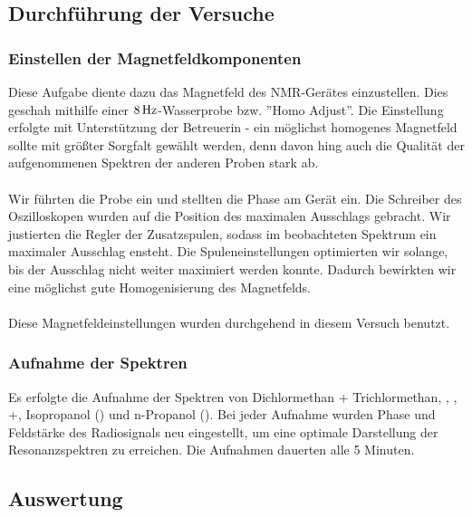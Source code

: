 \documentclass[a4paper,titlepage]{scrartcl}
\numberwithin{equation}{section}
\begin{document}
\subsection{Durchführung der Versuche}
\subsubsection{Einstellen der Magnetfeldkomponenten}
Diese Aufgabe diente dazu das Magnetfeld des NMR-Gerätes einzustellen. Dies geschah mithilfe einer $\unit[8]{Hz}$-Wasserprobe bzw. ''Homo Adjust''. Die Einstellung erfolgte mit Unterstützung der Betreuerin - ein möglichst homogenes Magnetfeld sollte mit größter Sorgfalt gewählt werden, denn davon hing auch die Qualität der aufgenommenen Spektren der anderen Proben stark ab.\\ \\
Wir führten die Probe ein und stellten die Phase am Gerät ein. Die Schreiber des Oszilloskopen wurden auf die Position des maximalen Ausschlags gebracht. Wir justierten die Regler der Zusatzspulen, sodass im beobachteten Spektrum ein maximaler Ausschlag ensteht. Die Spuleneinstellungen optimierten wir solange, bis der Ausschlag nicht weiter maximiert werden konnte. Dadurch bewirkten wir eine möglichst gute Homogenisierung des Magnetfelds.\\ \\
Diese Magnetfeldeinstellungen wurden durchgehend in diesem Versuch benutzt.
\subsubsection{Aufnahme der Spektren}
Es erfolgte die Aufnahme der Spektren von Dichlormethan + Trichlormethan, , , +, Isopropanol () und n-Propanol (). Bei jeder Aufnahme wurden Phase und Feldstärke des Radiosignals neu eingestellt, um eine optimale Darstellung der Resonanzspektren zu erreichen. Die Aufnahmen dauerten alle 5 Minuten.
\subsection{Auswertung}
\end{document}
